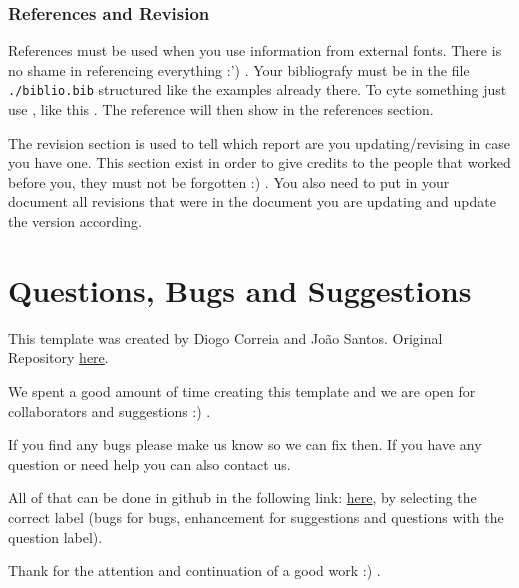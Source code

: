 \documentclass[]{engenius}
\begin{document}
\subsubsection{References and Revision}

References must be used when you use information from external fonts. There is no shame in referencing everything :') . Your bibliografy must be in the file \texttt{./biblio.bib} structured like the examples already there. To cyte something just use \texttt{\cite{name}}, like this \cite{einstein}. The reference will then show in the references section.

The revision section is used to tell which report are you updating/revising in case you have one. This section exist in order to give credits to the people that worked before you, they must not be forgotten :) . You also need to put in your document all revisions that were in the document you are updating and update the version according.

\section{Questions, Bugs and Suggestions}

This template was created by Diogo Correia and João Santos.
Original Repository \textcolor{blue}{\href{https://github.com/dvcorreia/engenius-ua-latex-template}{here}}.

We spent a good amount of time creating this template and we are open for collaborators and suggestions :) .

If you find any bugs please make us know so we can fix then.
If you have any question or need help you can also contact us.

All of that can be done in github in the following link:  \textcolor{blue}{\href{https://github.com/dvcorreia/engenius-ua-latex-template/issues/new}{here}}, by selecting the correct label (bugs for bugs, enhancement for suggestions and  questions with the question label).

Thank for the attention and continuation of a good work :) .





\revisions
{}
\end{document}
